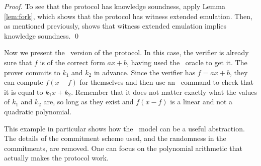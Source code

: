 \begin{proof}
To see that the protocol has knowledge soundness, apply Lemma \ref{lem:fork}, which shows that the protocol has witness extended emulation. Then, as mentioned previously,  \cite{dissertation} shows that witness extended emulation implies knowledge soundness. \qed
%
%
\end{proof}

Now we present the \ILC\ version of the protocol. In this case, the verifier is already sure that $f$ is of the correct form $ax+b$, having used the \ILCopen\ oracle to get it. The prover commits to $k_1$ and $k_2$ in advance. Since the verifier has $f = ax+b$, they can compute $f(x-f)$ for themselves and then use an \ILCcheck\ command to check that it is equal to $k_1 x+ k_2$. Remember that it does not matter exactly what the values of $k_1$ and $k_2$ are, so long as they exist and $f(x-f)$ is a linear and not a quadratic polynomial.

This example in particular shows how the \ILC\ model can be a useful abstraction. The details of the commitment scheme used, and the randomness in the commitments, are removed. One can focus on the polynomial arithmetic that actually makes the protocol work.

